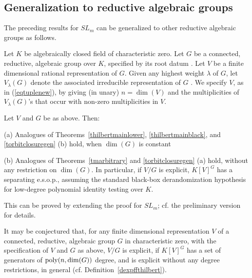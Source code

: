 \documentclass[11pt]{article}
\begin{document}
\subsection{Generalization to 
reductive algebraic groups} \label{sgeneralize}
The preceding results for $SL_m$  can be generalized to other  reductive
algebraic groups  as follows.

Let $K$ be algebraically closed field of characteristic zero.
Let $G$ be  a connected, reductive, algebraic group over $K$,
specified by its root datum \cite{humphreys,milne}.
Let $V$ be a  finite dimensional  rational representation of $G$.
Given any highest weight $\lambda$ of $G$, let $V_\lambda(G)$ denote the 
associated irreducible representation of $G$ \cite{fultonrepr}. 
We specify $V$, as in (\ref{eqtuplenew}),
by giving (in unary)  $n=\dim(V)$ and  the multiplicities of $V_\lambda(G)$'s that occur with non-zero 
multiplicities in $V$.

\begin{theorem} \label{tsemisimple}
Let $V$ and $G$ be as above. Then:

\noindent (a) Analogues of Theorems~\ref{thilbertmainlower}, \ref{thilbertmainblack},  and 
\ref{torbitclosuregen} (b) hold,  when $\dim(G)$ is constant

\noindent (b) Analogues of Theorems~\ref{tmarbitrary} and \ref{torbitclosuregen}  (a)
hold, without any restriction on $\dim(G)$. In particular, if $V/G$ is explicit, 
$K[V]^G$ has a separating e.s.o.p.,  assuming the standard black-box derandomization hypothesis
for low-degree polynomial identity testing over $K$.
\end{theorem}

This can be proved by extending the proof for $SL_m$;
cf. the preliminary version \cite{GCT5focs} for details.

It may be conjectured that,
for any finite dimensional representation $V$ of a connected, reductive, algebraic
group $G$ in characteristic zero, with the specification of $V$ and $G$ as above,
$V/G$ is explicit, if $K[V]^G$ has a set of generators
of  ${\mbox {poly}}(n,\dim(G))$ degree, and is explicit 
without any degree restrictions, in general (cf. Definition~\ref{dexpffthilbert}).
\end{document}
